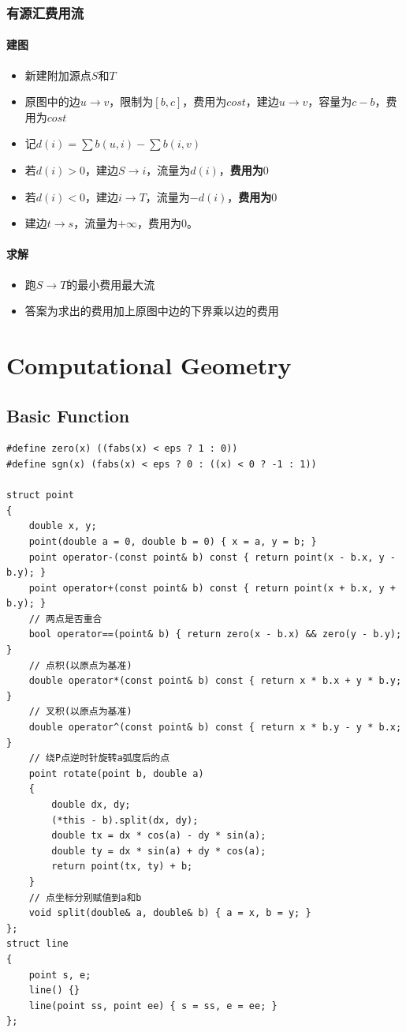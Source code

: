 \documentclass[twoside]{article}
\begin{document}
\subsubsection*{有源汇费用流}
\paragraph{建图}
\begin{itemize}
\item 新建附加源点$S$和$T$
\item 原图中的边$u \rightarrow v$，限制为$[b,c]$，费用为$cost$，建边$u \rightarrow v$，容量为$c-b$，费用为$cost$
\item 记$d(i) = \sum b(u,i) - \sum b(i,v) $
\item 若$d(i)>0$，建边$S \rightarrow i$，流量为$d(i)$，\textbf{费用为$0$}
\item 若$d(i)<0$，建边$i \rightarrow T$，流量为$-d(i)$，\textbf{费用为$0$}
\item 建边$t \rightarrow s$，流量为$+\infty$，费用为$0$。
\end{itemize}

\paragraph{求解}
\begin{itemize}
\item 跑$S \rightarrow T$的最小费用最大流
\item 答案为求出的费用加上原图中边的下界乘以边的费用
\end{itemize}
\clearpage
\section{Computational Geometry}
\subsection{Basic Function}
\begin{lstlisting}
#define zero(x) ((fabs(x) < eps ? 1 : 0))
#define sgn(x) (fabs(x) < eps ? 0 : ((x) < 0 ? -1 : 1))

struct point
{
    double x, y;
    point(double a = 0, double b = 0) { x = a, y = b; }
    point operator-(const point& b) const { return point(x - b.x, y - b.y); }
    point operator+(const point& b) const { return point(x + b.x, y + b.y); }
    // 两点是否重合
    bool operator==(point& b) { return zero(x - b.x) && zero(y - b.y); }
    // 点积(以原点为基准)
    double operator*(const point& b) const { return x * b.x + y * b.y; }
    // 叉积(以原点为基准)
    double operator^(const point& b) const { return x * b.y - y * b.x; }
    // 绕P点逆时针旋转a弧度后的点
    point rotate(point b, double a)
    {
        double dx, dy;
        (*this - b).split(dx, dy);
        double tx = dx * cos(a) - dy * sin(a);
        double ty = dx * sin(a) + dy * cos(a);
        return point(tx, ty) + b;
    }
    // 点坐标分别赋值到a和b
    void split(double& a, double& b) { a = x, b = y; }
};
struct line
{
    point s, e;
    line() {}
    line(point ss, point ee) { s = ss, e = ee; }
};
\end{lstlisting}
\end{document}
